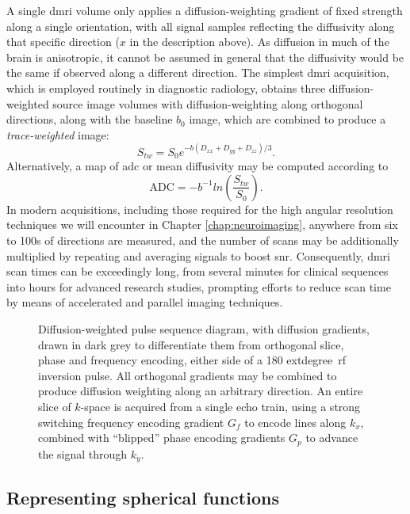 A single \gls{dmri} volume only applies a diffusion-weighting gradient of fixed strength along a single orientation, with all signal samples reflecting the diffusivity along that specific direction ($x$ in the description above).
As diffusion in much of the brain is anisotropic, it cannot be assumed in general that the diffusivity would be the same if observed along a different direction.
The simplest \gls{dmri} acquisition, which is employed routinely in diagnostic radiology, obtains three diffusion-weighted source image volumes with diffusion-weighting along orthogonal directions, along with the baseline $b_0$ image, which are combined to produce a \textit{trace-weighted} image:
\begin{equation}
  S_{tw} = S_0 e^{-b(D_{xx} + D_{yy} + D_{zz})/3}. \label{eq:trace}
\end{equation}
Alternatively, a map of \gls{adc} or mean diffusivity may be computed according to
\begin{equation}
  \text{ADC} = -b^{-1} ln (\frac{S_{tw}}{S_0}). \label{eq:adc}
\end{equation}
In modern acquisitions, including those required for the high angular resolution techniques we will encounter in Chapter \ref{chap:neuroimaging}, anywhere from six to 100s of directions are measured, and the number of scans may be additionally multiplied by repeating and averaging signals to boost \gls{snr}.
Consequently, \gls{dmri} scan times can be exceedingly long, from several minutes for clinical sequences into hours for advanced research studies, prompting efforts to reduce scan time by means of accelerated and parallel imaging techniques.

\begin{figure}[htb!]
  
  \caption[Diffusion-weighted EPI pulse sequence diagram]{Diffusion-weighted  pulse sequence diagram, with diffusion gradients, drawn in dark grey to differentiate them from orthogonal slice, phase and frequency encoding, either side of a 180	extdegree\ \gls{rf} inversion pulse. All orthogonal gradients may be combined to produce diffusion weighting along an arbitrary direction. An entire slice of $k$-space is acquired from a single echo train, using a strong switching frequency encoding gradient $G_f$ to encode lines along $k_x$, combined with ``blipped'' phase encoding gradients $G_p$ to advance the signal through $k_y$.}
  \label{fig:dwepi}
\end{figure}

\subsection{Representing spherical functions}
\label{sec:sh}

